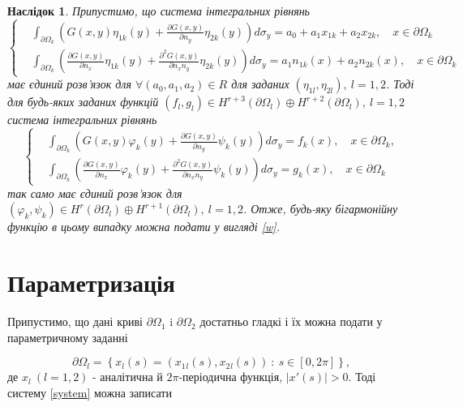 \documentclass[12pt]{report}
\newtheorem{collocation}{Наслідок}
\begin{document}
 \begin{collocation}
 	Припустимо, що система інтегральних рівнянь
	\begin{equation*}
		\left\{
		\begin{split}
			&\int_{\partial\Omega_k}(G(x,y)\eta_{1k}(y)+\frac{\partial G(x,y)}{\partial n_y}\eta_{2k}(y))d\sigma_y=a_0+a_1x_{1k}+a_2x_{2k}, \quad x\in\partial\Omega_k \\
			&\int_{\partial\Omega_k}(\frac{\partial G(x,y)}{\partial n_x}\eta_{1k}(y)+\frac{\partial^2 G(x,y)}{\partial n_x n_y}\eta_{2k}(y))d\sigma_y=a_1n_{1k}(x)+a_2n_{2k}(x), \quad x\in\partial\Omega_k
		\end{split}
		\right.
	\end{equation*}
	має єдиний розв'язок для $\forall (a_0,a_1,a_2)\in R$ для заданих $(\eta_{1l},\eta_{2l}), \ l=1,2$. Тоді для будь-яких заданих функцій  
	$(f_l,g_l) \in H^{r+3}(\partial\Omega_l)\oplus H^{r+2}(\partial\Omega_l), \ l=1,2$ система інтегральних рівнянь
	\begin{equation*}
		\left\{
		\begin{split}
			&\int_{\partial\Omega_k}(G(x,y)\varphi_k(y)+\frac{\partial G(x,y)}{\partial n_y}\psi_k(y))d\sigma_y=f_k(x), \quad x\in\partial\Omega_k, \\
			&\int_{\partial\Omega_k}(\frac{\partial G(x,y)}{\partial n_x}\varphi_k(y)+\frac{\partial^2 G(x,y)}{\partial n_x n_y}\psi_k(y))d\sigma_y=g_k(x), \quad x\in\partial\Omega_k
		\end{split}
		\right.
	\end{equation*}
	 так само має єдиний розв'язок для  $(\varphi_k,\psi_k) \in H^{r}(\partial\Omega_l)\oplus H^{r+1}(\partial\Omega_l), \ l=1,2$. Отже, будь-яку бігармонійну функцію в цьому випадку можна подати у вигляді \eqref{w}.
 \end{collocation}
 
 \section{Параметризація}
 
 Припустимо, що дані криві $\partial\Omega_1$ i $\partial\Omega_2$ достатньо гладкі і їх можна подати у параметричному заданні 
 
 \begin{equation}
 	\partial\Omega_l=\left\{x_l(s)=(x_1{_l}(s),x_2{_l}(s)) \ : \ s\in [0,2\pi]\right\},
  \end{equation}
 де $x_l \ (l=1,2)$ - аналітична й $2\pi$-періодична функція, $|x'(s)|>0.$
 Тоді систему \eqref{system} можна записати 
 
\end{document}
